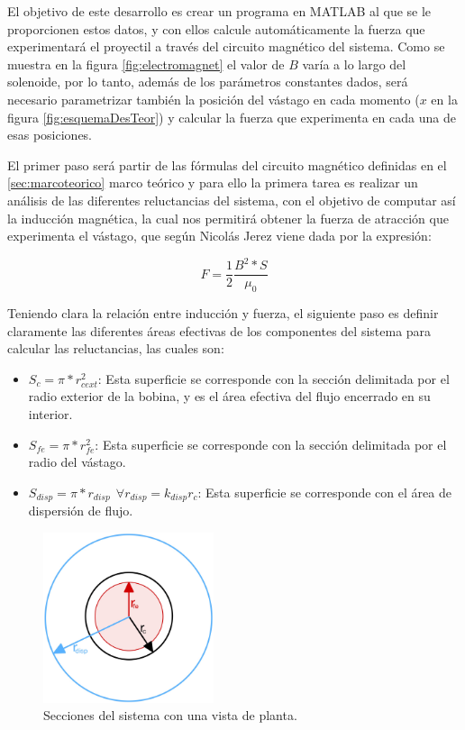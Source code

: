 El objetivo de este desarrollo es crear un programa en MATLAB al que se le proporcionen estos datos, y con ellos calcule automáticamente la fuerza que experimentará el proyectil a través del circuito magnético del sistema. Como se muestra en la figura \ref{fig:electromagnet} el valor de \(B\) varía a lo largo del solenoide, por lo tanto, además de los parámetros constantes dados, será necesario parametrizar también la posición del vástago en cada momento (\(x\) en la figura \ref{fig:esquemaDesTeor}) y calcular la fuerza que experimenta en cada una de esas posiciones.

El primer paso será partir de las fórmulas del circuito magnético definidas en el \ref{sec:marcoteorico} marco teórico y para ello la primera tarea es realizar un análisis de las diferentes reluctancias del sistema, con el objetivo de computar así la inducción magnética, la cual nos permitirá obtener la fuerza de atracción que experimenta el vástago, que según Nicolás Jerez \citep{jerez2016resueltos} viene dada por la expresión:

\begin{center}
\[F=\frac{1}{2}\frac{B^2*S}{\mu_0}\]
\end{center}

Teniendo clara la relación entre inducción y fuerza, el siguiente paso es definir claramente las diferentes áreas efectivas de los componentes del sistema para calcular las reluctancias, las cuales son:

\begin{itemize}
    \item \(S_{c}=\pi *r_{cext}^2\): Esta superficie se corresponde con la sección delimitada por el radio exterior de la bobina, y es el área efectiva del flujo encerrado en su interior.
    \item \(S_{fe}=\pi *r_{fe}^2\): Esta superficie se corresponde con la sección delimitada por el radio del vástago.
    \item \(S_{disp}=\pi *r_{disp}~~\forall r_{disp} = k_{disp}r_c\): Esta superficie se corresponde con el área de dispersión de flujo.
\end{itemize}

\begin{figure}[H]
    \centering
    \includegraphics[width=5cm]{FigurasMemoria/areasFlujo.jpg}
    \caption{Secciones del sistema con una vista de planta.}
    \label{fig:areasFlujo} %
\end{figure}

